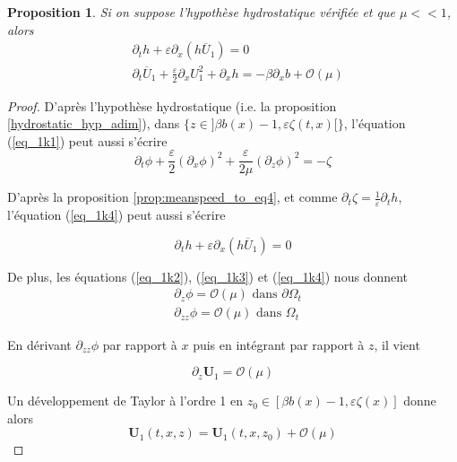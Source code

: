 \documentclass[12pt,a4paper]{article}
\newtheorem{prop}[dfn]{\textbf{Proposition}}
\numberwithin{equation}{section}
\begin{document}
\begin{prop}
    Si on suppose l'hypothèse hydrostatique vérifiée et que $\mu<<1$, alors 
    \begin{align}
        &\partial_th + \varepsilon\partial_{x}(h\overline{U}_1) = 0\\
        &\partial_t\overline{U}_1+\frac{\varepsilon}{2}\partial_x{U_1^2} + \partial_xh  = - \beta\partial_x b +  \mathcal{O}(\mu)
    \end{align}
\end{prop}
\begin{proof}
    D'après l'hypothèse hydrostatique (i.e. la proposition \ref{hydrostatic_hyp_adim}),  dans $\{z \in ]\beta b(x) -1 , \varepsilon \zeta(t,x) [\}$,  l'équation (\ref{eq_1k1}) peut aussi s'écrire
\begin{equation}
  \partial_{t} \phi + 
     \frac{\varepsilon}{2}(\partial_{x}\phi)^2+ \frac{\varepsilon}{2\mu}(\partial_{z}\phi)^2
     = -\zeta   \label{eq_1K1_h}
\end{equation}

D'après la proposition \ref{prop:meanspeed_to_eq4}, et comme $\partial_t\zeta = \frac{1}{\varepsilon}\partial_th$, l'équation (\ref{eq_1k4}) peut aussi s'écrire

\begin{equation}
  \partial_th + \varepsilon\partial_{x}(h\overline{U}_1) = 0
\end{equation}




De plus, les équations (\ref{eq_1k2}), (\ref{eq_1k3}) et (\ref{eq_1k4}) nous donnent
\begin{align}
    &\partial_z \phi = \mathcal{O}(\mu) \text{ dans } \partial\Omega_t \label{dzphismall}\\
    &\partial_{zz} \phi = \mathcal{O}(\mu) \text{ dans } \Omega_t
\end{align}

En dérivant $\partial_{zz}\phi$ par rapport à $x$ puis en intégrant par rapport à $z$, il vient



\begin{equation}
    \partial_{z}\textbf{U}_1 = \mathcal{O}(\mu)
\end{equation}

Un développement de Taylor à l'ordre 1 en $z_0 \in [\beta b (x) - 1 , \varepsilon \zeta(x)]$ donne alors
\begin{equation}
    \textbf{U}_1(t,x,z) = \textbf{U}_1(t,x,z_0) + \mathcal{O}(\mu)
\end{equation}


\end{proof}
\end{document}
